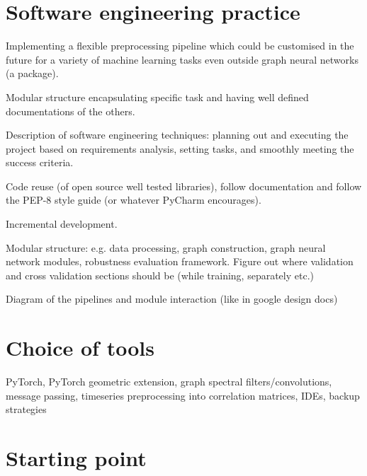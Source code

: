 \documentclass[12pt,a4paper,twoside, openright, hidelinks]{report}
\begin{document}
\section{Software engineering practice}
Implementing a flexible preprocessing pipeline which could be customised in the future for a variety of machine learning tasks even outside graph neural networks (a package).

Modular structure encapsulating specific task and having well defined documentations of the others.

Description of software engineering techniques: planning out and executing the project based on requirements analysis, setting tasks, and smoothly meeting the success criteria.

Code reuse (of open source well tested libraries), follow documentation and follow the PEP-8 style guide (or whatever PyCharm encourages).

Incremental development.

Modular structure: e.g. data processing, graph construction, graph neural network modules, robustness evaluation framework. Figure out where validation and cross validation sections should be (while training, separately etc.)

Diagram of the pipelines and module interaction (like in google design docs)


\section{Choice of tools}
PyTorch, PyTorch geometric extension, graph spectral filters/convolutions, message passing, timeseries preprocessing into correlation matrices, IDEs, backup strategies

\section{Starting point}
\end{document}

